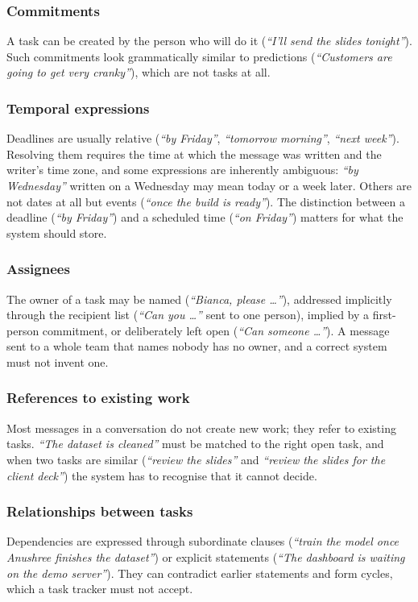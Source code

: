 \subsubsection{Commitments}
A task can be created by the person who will do it (\emph{``I'll send the slides tonight''}). Such commitments look grammatically similar to predictions (\emph{``Customers are going to get very cranky''}), which are not tasks at all.

\subsubsection{Temporal expressions}
Deadlines are usually relative (\emph{``by Friday''}, \emph{``tomorrow morning''}, \emph{``next week''}). Resolving them requires the time at which the message was written and the writer's time zone, and some expressions are inherently ambiguous: \emph{``by Wednesday''} written on a Wednesday may mean today or a week later. Others are not dates at all but events (\emph{``once the build is ready''}). The distinction between a deadline (\emph{``by Friday''}) and a scheduled time (\emph{``on Friday''}) matters for what the system should store.

\subsubsection{Assignees}
The owner of a task may be named (\emph{``Bianca, please \ldots''}), addressed implicitly through the recipient list (\emph{``Can you \ldots''} sent to one person), implied by a first-person commitment, or deliberately left open (\emph{``Can someone \ldots''}). A message sent to a whole team that names nobody has no owner, and a correct system must not invent one.

\subsubsection{References to existing work}
Most messages in a conversation do not create new work; they refer to existing tasks. \emph{``The dataset is cleaned''} must be matched to the right open task, and when two tasks are similar (\emph{``review the slides''} and \emph{``review the slides for the client deck''}) the system has to recognise that it cannot decide.

\subsubsection{Relationships between tasks}
Dependencies are expressed through subordinate clauses (\emph{``train the model once Anushree finishes the dataset''}) or explicit statements (\emph{``The dashboard is waiting on the demo server''}). They can contradict earlier statements and form cycles, which a task tracker must not accept.

